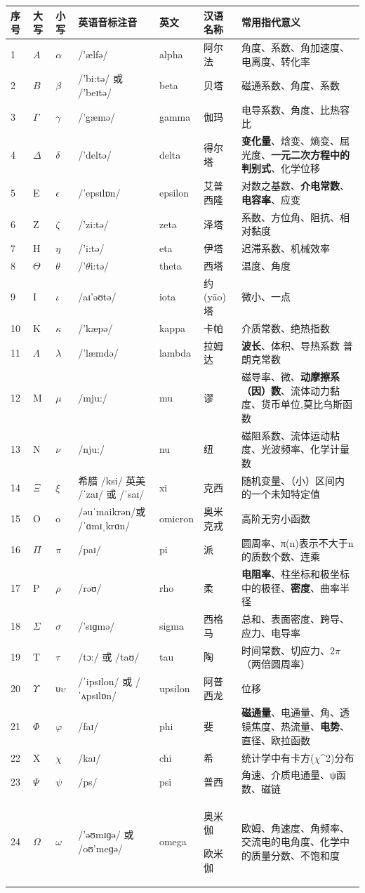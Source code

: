 \documentclass[cn,10.5pt,chinese,mac,chinesefont=founder]{elegantbook}
\begin{document}
\begin{longtable}[]{@{}m{0.8cm}m{0.8cm}m{0.8cm}m{2.2cm}m{1.5cm}m{1.6cm}m{6cm}@{}}
\toprule


\textbf{序号} & \textbf{大写} & \textbf{小写} & \textbf{英语音标注音} &
\textbf{英文} & \textbf{汉语名称} & \textbf{常用指代意义}\tabularnewline
\midrule
\endhead
1 & $A$ & $\alpha$ & /'ælfə/ & alpha & 阿尔法 &
角度、系数、角加速度、电离度、转化率\tabularnewline
2 & $B$ & $\beta$ & /'bi:tə/ 或 /'beɪtə/ & beta & 贝塔 &
磁通系数、角度、系数\tabularnewline
3 & $\Gamma$ & $\gamma$ & /'gæmə/ & gamma & 伽玛 &
电导系数、角度、比热容比\tabularnewline
4 & $\Delta$ & $\delta$ & /'deltə/ & delta & 得尔塔 &
\textbf{变化量}、焓变、熵变、屈光度、\textbf{一元二次方程中的判别式}、化学位移\tabularnewline
5 & E & $\epsilon$ & /'epsɪlɒn/ & epsilon & 艾普西隆 &
对数之基数、\textbf{介电常数}、\textbf{电容率}、应变\tabularnewline
6 & Z & $\zeta$ & /'zi:tə/ & zeta & 泽塔 &
系数、方位角、阻抗、相对黏度\tabularnewline
7 & H & $\eta$ & /'i:tə/ & eta & 伊塔 & 迟滞系数、机械效率\tabularnewline
8 & $\Theta$ & $\theta$ & /'$\theta$i:tə/ & theta & 西塔 & 温度、角度\tabularnewline
9 & I & $\iota$ & /aɪ'əʊtə/ & iota & 约(yāo)塔 & 微小、一点\tabularnewline
10 & K & $\kappa$ & /'kæpə/ & kappa & 卡帕 & 介质常数、绝热指数\tabularnewline
11 & $\Lambda$ & $\lambda$ & /'læmdə/ & lambda & 拉姆达 & \textbf{波长}、体积、导热系数
普朗克常数\tabularnewline
12 & M & $\mu$ & /mju:/ & mu & 谬 &
磁导率、微、\textbf{动摩擦系（因）数}、流体动力黏度、货币单位,莫比乌斯函数\tabularnewline
13 & N & $\nu$ & /nju:/ & nu & 纽 &
磁阻系数、流体运动粘度、光波频率、化学计量数\tabularnewline

14 & $\Xi$ & $\xi$ &希腊 /ksi/
英美 /ˈzaɪ/ 或 /ˈsaɪ/&xi&克西&随机变量、（小）区间内的一个未知特定值\tabularnewline

15&O&o&/əuˈmaikrən/或 /ˈɑmɪˌkrɑn/&omicron&奥米克戎& 高阶无穷小函数\tabularnewline
16 &$\Pi$&$\pi$& /paɪ/ & pi & 派 &
圆周率、π(n)表示不大于n的质数个数、连乘\tabularnewline
17 &P&$\rho$& /rəʊ/ & rho & 柔 &
\textbf{电阻率}、柱坐标和极坐标中的极径、\textbf{密度}、曲率半径\tabularnewline
18 & $\Sigma$ & $\sigma$ & /'sɪɡmə/ & sigma & 西格马 &
总和、表面密度、跨导、应力、电导率\tabularnewline
19 & T & $\tau$ & /tɔ:/ 或 /taʊ/ & tau & 陶 &
时间常数、切应力、2$\pi$（两倍圆周率）\tabularnewline

20 & $\Upsilon$ & υ$\upsilon$ & /ˈipsɪlon/
 或 /ˈʌpsɪlɒn/  & upsilon  &  阿普西龙 &  位移 \tabularnewline
21 & $\Phi$ & $\varphi$ & /faɪ/ & phi & 斐 &
\textbf{磁通量}、电通量、角、透镜焦度、热流量、\textbf{电势}、直径、欧拉函数\tabularnewline
22 & X & $\chi$ & /kaɪ/ & chi & 希 &
统计学中有卡方($\chi$\^{}2)分布\tabularnewline
23 & $\Psi$ & $\psi$ & /ps/ & psi & 普西 &
角速、介质电通量、ψ函数、磁链\tabularnewline
24 & $\Omega$ & $\omega$ & /'əʊmɪɡə/
或 /oʊ'meɡə/ & omega & \begin{minipage}[t]{0.12\columnwidth}\raggedright
奥米伽

欧米伽\strut
\end{minipage} &
欧姆、角速度、角频率、交流电的电角度、化学中的质量分数、不饱和度\tabularnewline
\bottomrule
\end{longtable}
\end{document}
